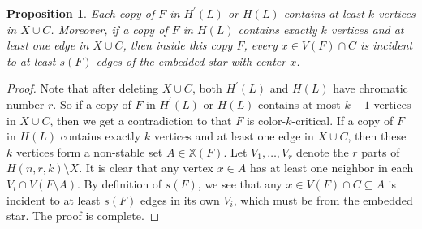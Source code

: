\documentclass[10pt]{article}
\newtheorem{proposition}[theorem]{Proposition}
\begin{document}
\begin{proposition}\label{ob 1}
Each copy of $F$ in $H^\prime(L)$ or $H(L)$ contains at least $k$ vertices in $X\cup C$.
Moreover, if a copy of $F$ in $H(L)$ contains exactly $k$ vertices and at least one edge in $X\cup C$,
then inside this copy $F$, every $x\in V(F)\cap C$ is incident to at least $s(F)$ edges of the embedded star with center $x$.
\end{proposition}
\begin{proof}
Note that after deleting $X\cup C$, both $H^\prime(L)$ and $H(L)$ have chromatic number $r$.
So if a copy of $F$ in $H^\prime(L)$ or $H(L)$ contains at most $k-1$ vertices in $X\cup C$, then we get a contradiction to that $F$ is color-$k$-critical.
If a copy of $F$ in $H(L)$ contains exactly $k$ vertices and at least one edge in $X\cup C$,
then these $k$ vertices form a non-stable set $A\in \mathbb{X}(F)$.
Let $V_1,\ldots,V_r$ denote the $r$ parts of $H(n,r,k)\setminus X$.
It is clear that any vertex $x\in A$ has at least one neighbor in each $V_i\cap V(F\setminus A)$.
By definition of $s(F)$, we see that any $x\in V(F)\cap C\subseteq A$ is incident to at least $s(F)$ edges in its own $V_i$, which must be from the embedded star.
The proof is complete.
\end{proof}
\end{document}
